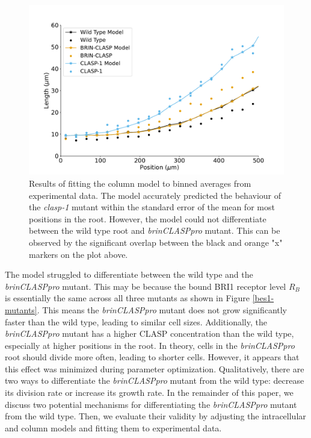 \documentclass[referee,pdflatex,sn-mathphys-num]{sn-jnl}
\begin{document}
\begin{figure}
  \centering
  \includegraphics[width=\textwidth]{column-original-fit.pdf}
\caption{Results of fitting the column model to binned averages from experimental data. The model accurately predicted the behaviour of the \emph{clasp-1} mutant within the standard error of the mean for most positions in the root. However, the model could not differentiate between the wild type root and \emph{brinCLASPpro} mutant. This can be observed by the significant overlap between the black and orange "x" markers on the plot above. }
\label{column-results}
\end{figure}

The model struggled to differentiate between the wild type and the \emph{brinCLASPpro} mutant. This may be because the bound BRI1 receptor level $R_{B}$ is essentially the same across all three mutants as shown in Figure \ref{bes1-mutants}. This means the \emph{brinCLASPpro} mutant does not grow significantly faster than the wild type, leading to similar cell sizes. Additionally, the \emph{brinCLASPpro} mutant has a higher CLASP concentration than the wild type, especially at higher positions in the root. In theory, cells in the \emph{brinCLASPpro} root should divide more often, leading to shorter cells. However, it appears that this effect was minimized during parameter optimization. Qualitatively, there are two ways to differentiate the \emph{brinCLASPpro} mutant from the wild type: decrease its division rate or increase its growth rate. In the remainder of this paper, we discuss two potential mechanisms for differentiating the \emph{brinCLASPpro} mutant from the wild type. Then, we evaluate their validity by adjusting the intracellular and column models and fitting them to experimental data.
\end{document}
